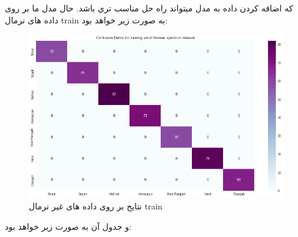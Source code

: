 \documentclass{article}
\begin{document}
كه اضافه كردن داده به مدل ميتواند راه حل مناسب تري باشد.\newline
حال مدل ما بر روی داده های نرمال train به صورت زیر خواهد بود:\newline
\begin{figure}[h]
	\centering
	\includegraphics[width=0.7\linewidth]{Photo/44}
	\caption[نتایج  بر روی داده های غیر نرمال train]{نتایج  بر روی داده های غیر نرمال train}
	\label{fig:45}
\end{figure}
 و جدول آن به صورت زیر خواهد بود:\newline
 \begin{table}[h]
 	\centering
 	\caption{ نتایج  بر روی داده های غیر نرمال test} \label{foo20}
 \end{table}
\end{document}

